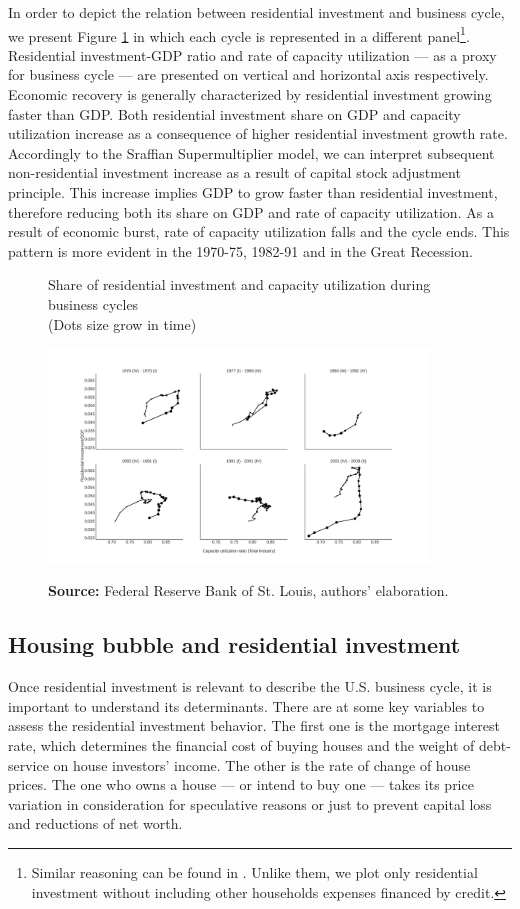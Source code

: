\documentclass[12pt]{article}
\begin{document}
In order to depict the relation between residential investment and business cycle, we present Figure \ref{fig:cycles} in which each cycle is represented in a different panel\footnote{Similar reasoning can be found in \textcite{fiebiger_trend_2017}. Unlike them, we plot only residential investment without including other households expenses financed by credit.}.
Residential investment-GDP ratio and rate of capacity utilization --- as a proxy for business cycle --- are presented on vertical and horizontal axis respectively.
Economic recovery is generally characterized by residential investment growing faster than GDP. Both residential investment share on GDP and capacity utilization increase as a consequence of higher residential investment growth rate.
Accordingly to the Sraffian Supermultiplier model, we can interpret subsequent non-residential investment increase as a result of capital stock adjustment principle. 
This increase implies GDP to grow faster than residential investment, therefore reducing both its share on GDP and rate of capacity utilization.
As a result of economic burst, rate of capacity utilization falls and the cycle ends.
This pattern is more evident in the 1970-75, 1982-91 and in the Great Recession.


\begin{figure}[htb]
    \centering
        \caption{Share of residential investment and capacity utilization during business cycles\\\centering (Dots size grow in  time)} 
    \includegraphics[width = 0.9\textwidth]{./figs/cycles.png}
    \label{fig:cycles}
    \caption*{\textbf{Source:} Federal Reserve Bank of St. Louis, authors’ elaboration.}
\end{figure}

\subsection{Housing bubble and residential investment}
\label{sec:orgd0c6213}
\label{sec_own}
Once residential investment is relevant to describe the U.S. business cycle, it is important to understand its determinants.
There are at some key variables to assess the residential investment behavior.
The first one is the mortgage interest rate, which determines the financial cost of buying houses and the weight of debt-service on house investors' income.
The other is the rate of change of house prices.
The one who owns a house --- or intend to buy one --- takes its price variation in consideration for speculative reasons or just to prevent capital loss and reductions of net worth.
\end{document}
